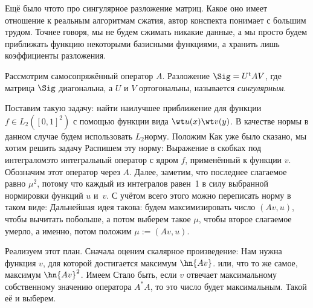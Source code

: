 \documentclass[a4paper]{article}
\begin{document}
Ещё было что\д то про сингулярное разложение матриц. Какое оно имеет отношение к реальным алгоритмам сжатия, автор конспекта
понимает с большим трудом. Точнее говоря, мы не будем сжимать никакие данные, а мы просто будем приближать функцию некоторыми
базисными функциями, а хранить лишь коэффициенты разложения.

\begin{df}
Рассмотрим самосопряжённый оператор $A$. Разложение $\Sig = U^tAV$, где матрица $\Sig$ диагональна, а $U$ и $V$ ортогональны,
называется \emph{сингулярным}.
\end{df}

Поставим такую задачу: найти наилучшее приближение для функции $f \in L_2([0,1]^2)$ с помощью функции вида $\wt u(x)\wt v(y)$.
В качестве нормы в данном случае будем использовать $L_2$\д норму.
Положим
Как уже было сказано, мы хотим решить задачу
Распишем эту норму:
Выражение в скобках под интегралом\т это интегральный оператор с ядром $f$, применённый к функции $v$.
Обозначим этот оператор через $A$. Далее, заметим, что последнее слагаемое равно $\mu^2$, потому что каждый
из интегралов равен~1 в силу выбранной нормировки функций $u$ и~$v$.
С учётом всего этого можно переписать норму в таком виде:
Дальнейшая идея такова: будем максимизировать число $(Av,u)$, чтобы вычитать побольше,
а потом выберем такое $\mu$, чтобы второе слагаемое умерло, а именно, потом положим $\mu := (Av,u)$.

Реализуем этот план. Сначала оценим скалярное произведение:
Нам нужна функция $v$, для которой достигается максимум $\hn{A v}$.
или, что то же самое, максимум $\hn{A v}^2$.
Имеем
Стало быть, если $v$ отвечает максимальному собственному значению оператора $A^*A$,
то это число будет максимальным. Такой её и выберем.
\end{document}
